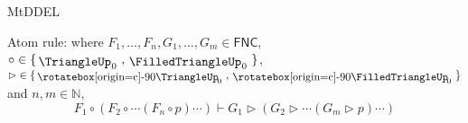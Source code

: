 \begin{entry}{MtDDEL}
%
\newcommand{\agand}{\mbox{$\sqcap$}}
\newcommand{\agAND}{\mbox{$\,\,\bigsqcap\,\,$}}
%
\newcommand{\agor}{\mbox{$\sqcup$}}
\newcommand{\agOR}{\mbox{$\,\,\bigsqcup\,\,$}}
%
\def\agra{\mbox{$\,{\aol{\mkern-1.5mu{\rotatebox[origin=c]{-90}{\raisebox{0.12ex}{$\agand$}}}}}\,$}}
\def\agRA{\mbox{$\,\,{\AOL{\mkern-0.4mu{\rotatebox[origin=c]{-90}{\raisebox{0.12ex}{$\agAND$}}}}}\,\,$}}
\def\agla{\mbox{$\,{\rotatebox[origin=c]{180}{$\aol{\mkern-1.6mu{\rotatebox[origin=c]{-90}{\raisebox{0.12ex}{$\agand$}}}}$}}\,$}}
\def\agLA{\mbox{\rotatebox[origin=c]{180}{$\,\,{\AOL{\mkern-0.4mu{\rotatebox[origin=c]{-90}{\raisebox{0.12ex}{$\agAND$}}}}}\,\,$}}}
%
\def\agdra{\mbox{$\,{\rotatebox[origin=c]{-90}{\raisebox{0.12ex}{$\agand$}}{\mkern-1.1mu\aol}}\,$}}
\def\agDRA{\mbox{$\,\,{\rotatebox[origin=c]{-90}{\raisebox{0.12ex}{$\agAND$}}{\mkern-0.7mu\AOL}}\,\,$}}
\def\agdla{\mbox{\rotatebox[origin=c]{180}{$\,{\rotatebox[origin=c]{-90}{\raisebox{0.12ex}{$\agand$}}{\mkern-1.1mu\aol}}\,$}}}
\def\agDLA{\mbox{\rotatebox[origin=c]{180}{$\,\,{\rotatebox[origin=c]{-90}{\raisebox{0.12ex}{$\agAND$}}{\mkern-0.7mu\AOL}}\,\,$}}}
%
\def\agTOP{{_{\textrm{g\!\!}}\textrm{T}}}
\def\agtop{{_{\textrm{g\!\!\!}}\top}}
\def\agBOT{\textrm{\rotatebox[origin=c]{180}{T}}^{\textrm{\!g}}}
\def\agbot{\bot^{\textrm{\!\!g}}}
\def\agneg{\mbox{$\mkern-0.4mu\sim\mkern-0.4mu$}}

\def\aga{\texttt{a}}
\def\agb{\texttt{b}}
\def\agc{\texttt{c}}
\def\agd{\texttt{d}}
\def\agA{{\Large{\texttt{a}}}}
\def\agB{\Large{\texttt{b}}}
\def\agC{\texttt{C}}
\def\agD{\texttt{D}}

\def\bulletaga{{\bullet_{\!\aga}}}
\def\circaga{{\circ_{\!\aga}}}
\def\Wdiaaga{{\Wdia_{\!\aga}}}
\def\Bdiaaga{{\Bdia_{\!\aga}}}
\def\Wboxaga{{\Wbox_{\aga}}}
\def\Bboxaga{{\Bbox_{\aga}}}
%
\def\andol{\rule[-0.4563ex]{1.38ex}{0.1ex}}
\def\aol{\rule[0.5865ex]{1.38ex}{0.1ex}}
\def\AOL{\rule[0.65ex]{1.45ex}{0.1ex}}
\def\orol{\rule[1.4253ex]{1.38ex}{0.1ex}}
%





\begin{calculus}
{
Atom rule: where  $F_1,\ldots, F_n, G_1,\ldots, G_m\in \mathsf{FNC}$, $\circ \in
\{\mAND_{\! 0} \ , \mBAND_{\! 0} \ \}$, ${\rhd} \in \{\mRA_{\!\! 0} \ ,
\mBRA_{\!\! 0} \ \}$ and $n, m\in \mathbb{N}$,
\[
F_1 \circ (F_2 \circ \cdots (F_n \circ p) \cdots)\vdash G_1 {\rhd} (G_2 {\rhd} \cdots (G_m {\rhd} p)\cdots)
\]

}
\end{calculus}
\end{entry}
